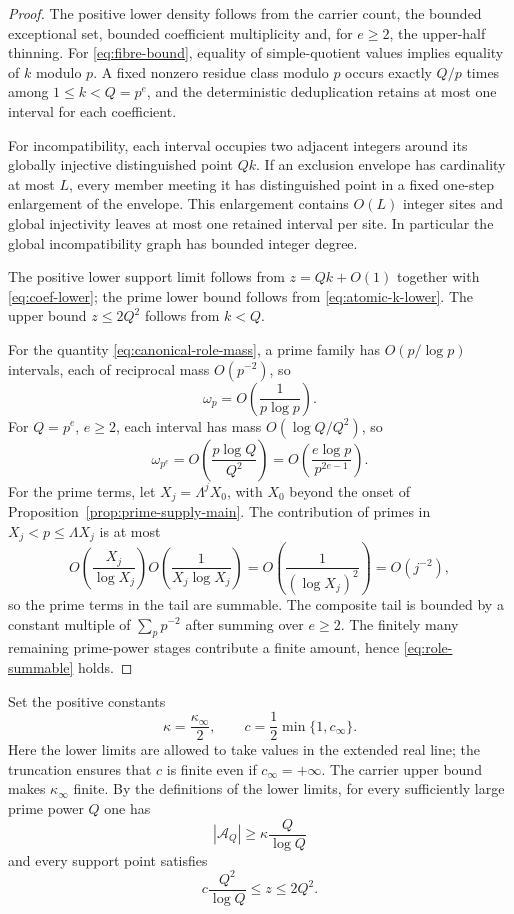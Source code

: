 \begin{proof}
The positive lower density follows from the carrier count, the bounded exceptional set, bounded coefficient multiplicity and, for $e\ge2$, the upper-half thinning.  For \eqref{eq:fibre-bound}, equality of simple-quotient values implies equality of $k$ modulo $p$.  A fixed nonzero residue class modulo $p$ occurs exactly $Q/p$ times among $1\le k<Q=p^e$, and the deterministic deduplication retains at most one interval for each coefficient.

For incompatibility, each interval occupies two adjacent integers around its globally injective distinguished point $Qk$.  If an exclusion envelope has cardinality at most $L$, every member meeting it has distinguished point in a fixed one-step enlargement of the envelope.  This enlargement contains $O(L)$ integer sites and global injectivity leaves at most one retained interval per site.  In particular the global incompatibility graph has bounded integer degree.

The positive lower support limit follows from $z=Qk+O(1)$ together with \eqref{eq:coef-lower}; the prime lower bound follows from \eqref{eq:atomic-k-lower}.  The upper bound $z\le2Q^2$ follows from $k<Q$.

For the quantity \eqref{eq:canonical-role-mass}, a prime family has $O(p/\log p)$ intervals, each of reciprocal mass $O(p^{-2})$, so
\[
\omega_p=O\!\left(\frac1{p\log p}\right).
\]
For $Q=p^e$, $e\ge2$, each interval has mass $O(\log Q/Q^2)$, so
\[
\omega_{p^e}
=O\!\left(\frac{p\log Q}{Q^2}\right)
=O\!\left(\frac{e\log p}{p^{2e-1}}\right).
\]
For the prime terms, let $X_j=\Lambda^jX_0$, with $X_0$ beyond the onset of Proposition~\ref{prop:prime-supply-main}.  The contribution of primes in $X_j<p\le\Lambda X_j$ is at most
\[
O\!\left(\frac{X_j}{\log X_j}\right)
O\!\left(\frac1{X_j\log X_j}\right)
=O\!\left(\frac1{(\log X_j)^2}\right)
=O(j^{-2}),
\]
so the prime terms in the tail are summable.  The composite tail is bounded by a constant multiple of $\sum_p p^{-2}$ after summing over $e\ge2$.  The finitely many remaining prime-power stages contribute a finite amount, hence \eqref{eq:role-summable} holds.
\end{proof}

Set the positive constants
\begin{equation}\label{eq:canonical-density-support-constants}
\kappa=\frac{\kappa_\infty}{2},
\qquad
c=\frac12\min\{1,c_\infty\}.
\end{equation}
Here the lower limits are allowed to take values in the extended real line; the truncation ensures that $c$ is finite even if $c_\infty=+\infty$.  The carrier upper bound makes $\kappa_\infty$ finite.  By the definitions of the lower limits, for every sufficiently large prime power $Q$ one has
\begin{equation}\label{eq:family-size}
|\mathcal A_Q|\ge\kappa\frac Q{\log Q}
\end{equation}
and every support point satisfies
\begin{equation}\label{eq:support-window}
c\frac{Q^2}{\log Q}\le z\le2Q^2.
\end{equation}

